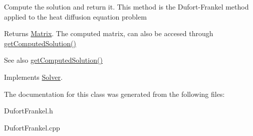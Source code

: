 Compute the solution and return it. This method is the Dufort-\/\+Frankel method applied to the heat diffusion equation problem \begin{DoxyReturn}{Returns}
\mbox{\hyperlink{classMatrix}{Matrix}}. The computed matrix, can also be accesed through \mbox{\hyperlink{classSolver_aafe88ce4130c001052e5d93c1681f90f}{get\+Computed\+Solution()}} 
\end{DoxyReturn}
\begin{DoxySeeAlso}{See also}
\mbox{\hyperlink{classSolver_aafe88ce4130c001052e5d93c1681f90f}{get\+Computed\+Solution()}} 
\end{DoxySeeAlso}


Implements \mbox{\hyperlink{classSolver_a0f4ecfaed825407019995b5176e25748}{Solver}}.



The documentation for this class was generated from the following files\+:\begin{DoxyCompactItemize}
\item 
Dufort\+Frankel.\+h\item 
Dufort\+Frankel.\+cpp\end{DoxyCompactItemize}
